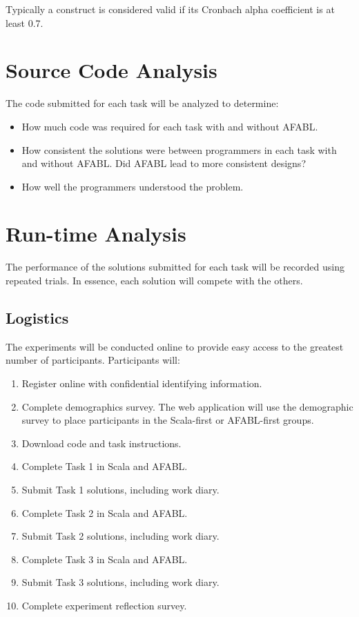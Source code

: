 \begin{appendices}
Typically a construct is considered valid if its Cronbach alpha coefficient is at least 0.7.



\section{Source Code Analysis}

The code submitted for each task will be analyzed to determine:

\begin{itemize}
\item How much code was required for each task with and without AFABL.
\item How consistent the solutions were between programmers in each task with and without AFABL.  Did AFABL lead to more consistent designs?
\item How well the programmers understood the problem.
\end{itemize}

\section{Run-time Analysis}

The performance of the solutions submitted for each task will be recorded using repeated trials.  In essence, each solution will compete with the others.

\subsection{Logistics}

The experiments will be conducted online to provide easy access to the greatest number of participants.  Participants will:

\begin{enumerate}
\item Register online with confidential identifying information.
\item Complete demographics survey.  The web application will use the demographic survey to place participants in the Scala-first or AFABL-first groups.
\item Download code and task instructions.
\item Complete Task 1 in Scala and AFABL.
\item Submit Task 1 solutions, including work diary.
\item Complete Task 2 in Scala and AFABL.
\item Submit Task 2 solutions, including work diary.
\item Complete Task 3 in Scala and AFABL.
\item Submit Task 3 solutions, including work diary.
\item Complete experiment reflection survey.
\end{enumerate}


\end{appendices}
